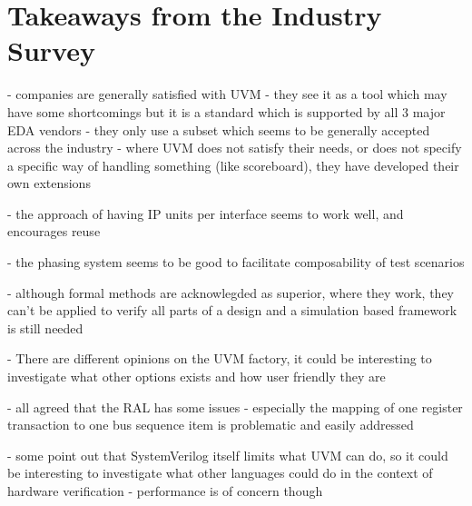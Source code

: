 \documentclass[12pt]{report}
\begin{document}
\begin{comment}
- have own UVM extensions and methodology
- have own scoreboard implementation

- one issue is reset handling in CRV
- own agent for reset handling
- phase hopping is difficult and messy

- see most issues with SV limitations
- parameterized interfaces
- verbose
- boiler plate

- but prefers guidelines over limitations for UVM

- prefers to keep verification code simle and understandable, also for RTL engineers
- does not like overly complex features like event callbacks

\end{comment}

\section{Takeaways from the Industry Survey} %

- companies are generally satisfied with UVM
- they see it as a tool which may have some shortcomings but it is a standard which is supported by all 3 major EDA vendors
- they only use a subset which seems to be generally accepted across the industry
- where UVM does not satisfy their needs, or does not specify a specific way of handling something (like scoreboard),
they have developed their own extensions

- the approach of having IP units per interface seems to work well, and encourages reuse

- the phasing system seems to be good to facilitate composability of test scenarios

- although formal methods are acknowlegded as superior, where they work, they can't be applied to verify all parts of
a design and a simulation based framework is still needed

- There are different opinions on the UVM factory, it could be interesting to investigate what other options exists
and how user friendly they are

- all agreed that the RAL has some issues
- especially the mapping of one register transaction to one bus sequence item is problematic and easily addressed

- some point out that SystemVerilog itself limits what UVM can do, so it could be interesting to investigate what
other languages could do in the context of hardware verification
- performance is of concern though
\end{document}
